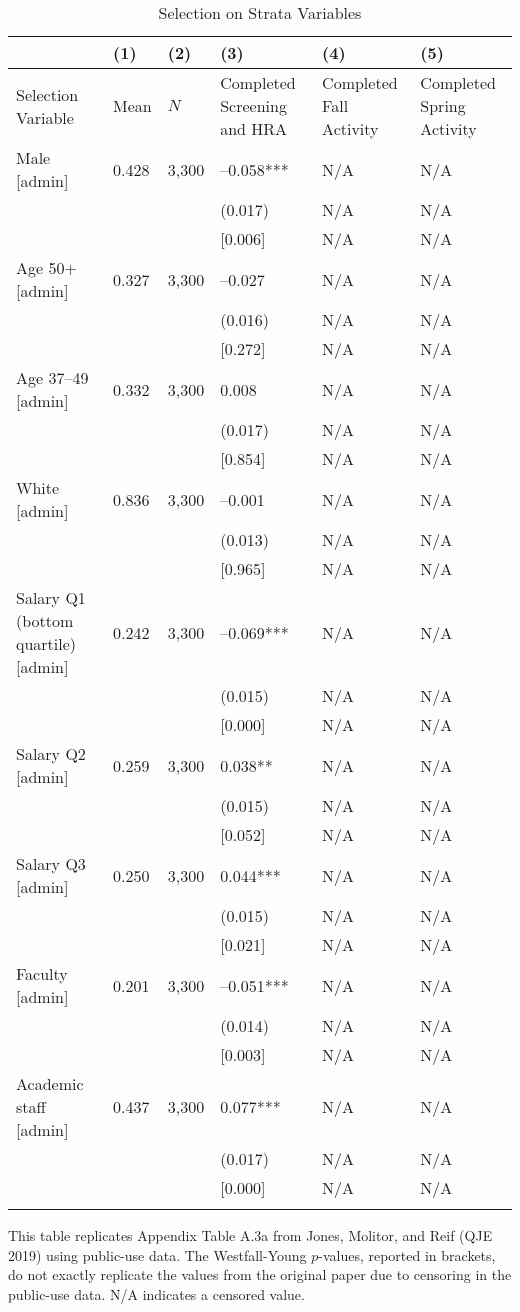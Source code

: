 \documentclass{article}
\begin{document}
\begin{table}[tbp] \centering
{}

\caption{Selection on Strata Variables}
{\scriptsize
\begin{tabularx}{\linewidth}{lCCCCC}

\toprule
&{(1)}&{(2)}&{(3)}&{(4)}&{(5)} \tabularnewline \midrule
{Selection Variable}&{Mean}&{\(N\)}&{Completed Screening and HRA}&{Completed Fall Activity}&{Completed Spring Activity} \tabularnewline
\midrule \addlinespace[\belowrulesep]
Male [admin]&0.428&3,300&--0.058***&N/A&N/A \tabularnewline
&&&(0.017)&N/A&N/A \tabularnewline
&&&[0.006]&N/A&N/A \tabularnewline
Age 50+ [admin]&0.327&3,300&--0.027&N/A&N/A \tabularnewline
&&&(0.016)&N/A&N/A \tabularnewline
&&&[0.272]&N/A&N/A \tabularnewline
Age 37--49 [admin]&0.332&3,300&0.008&N/A&N/A \tabularnewline
&&&(0.017)&N/A&N/A \tabularnewline
&&&[0.854]&N/A&N/A \tabularnewline
White [admin]&0.836&3,300&--0.001&N/A&N/A \tabularnewline
&&&(0.013)&N/A&N/A \tabularnewline
&&&[0.965]&N/A&N/A \tabularnewline
Salary Q1 (bottom quartile) [admin]&0.242&3,300&--0.069***&N/A&N/A \tabularnewline
&&&(0.015)&N/A&N/A \tabularnewline
&&&[0.000]&N/A&N/A \tabularnewline
Salary Q2 [admin]&0.259&3,300&0.038**&N/A&N/A \tabularnewline
&&&(0.015)&N/A&N/A \tabularnewline
&&&[0.052]&N/A&N/A \tabularnewline
Salary Q3 [admin]&0.250&3,300&0.044***&N/A&N/A \tabularnewline
&&&(0.015)&N/A&N/A \tabularnewline
&&&[0.021]&N/A&N/A \tabularnewline
Faculty [admin]&0.201&3,300&--0.051***&N/A&N/A \tabularnewline
&&&(0.014)&N/A&N/A \tabularnewline
&&&[0.003]&N/A&N/A \tabularnewline
Academic staff [admin]&0.437&3,300&0.077***&N/A&N/A \tabularnewline
&&&(0.017)&N/A&N/A \tabularnewline
&&&[0.000]&N/A&N/A \tabularnewline
\bottomrule \addlinespace[\belowrulesep]

\end{tabularx}
\begin{flushleft}
\footnotesize This table replicates Appendix Table A.3a from Jones, Molitor, and Reif (QJE 2019) using public-use data. The Westfall-Young \(p\)-values, reported in brackets, do not exactly replicate the values from the original paper due to censoring in the public-use data. N/A indicates a censored value.
\end{flushleft}
}
\end{table}
\end{document}
